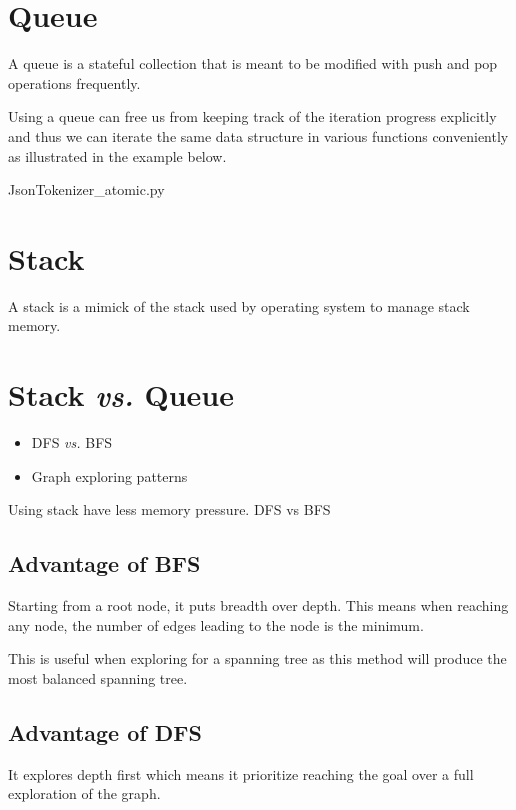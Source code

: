 \section{Queue}\label{sec:queue}

A queue is a stateful collection that is meant to be modified with push and pop operations
frequently.

Using a queue can free us from keeping track of the iteration progress explicitly and thus we can
iterate the same data structure in various functions conveniently as illustrated in the example
below.

{JsonTokenizer_atomic.py}

\section{Stack}\label{sec:stack}
A stack is a mimick of the stack used by operating system to manage stack memory.

\section{Stack \textit{vs.} Queue}
\begin{itemize}
    \item DFS \textit{vs.} BFS \label{Evernote:DFS vs BFS}
    \item Graph exploring patterns
\end{itemize}

Using stack have less memory pressure.
DFS vs BFS

\subsection{Advantage of BFS}
Starting from a root node, it puts breadth over depth.
This means when reaching any node, the number of edges leading to the node is the minimum.

This is useful when exploring for a spanning tree as this method will produce the most balanced
spanning tree.

\subsection{Advantage of DFS}

It explores depth first which means it prioritize reaching the goal over a full exploration of
the graph.

